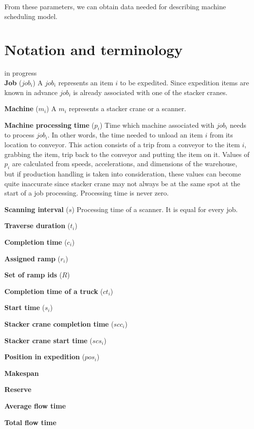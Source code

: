 \documentclass{ctuthesis}
\begin{document}
From these parameters, we can obtain data needed for describing machine scheduling model.


\section{Notation and terminology}
in progress\\
\noindent \textbf{Job} ($job_i$) A $job_i$ represents an item $i$ to be expedited. Since expedition items are known in advance $job_i$ is already associated with one of the stacker cranes. 

\noindent \textbf{Machine} ($m_i$) A $m_i$ represents a stacker crane or a scanner. 

\noindent \textbf{Machine processing time} ($p_i$) Time which machine associated with $job_i$ needs to process $job_i$. In other words, the time needed to unload an item $i$ from its location to conveyor. This action consists of a trip from a conveyor to the item $i$, grabbing the item, trip back to the conveyor and putting the item on it. Values of $p_i$ are calculated from speeds, accelerations, and dimensions of the warehouse, but if production handling is taken into consideration, these values can become quite inaccurate since stacker crane may not always be at the same spot at the start of a job processing. Processing time is never zero.


\noindent \textbf{Scanning interval} ($s$) Processing time of a scanner. It is equal for every job.

\noindent \textbf{Traverse duration} ($t_i$)

\noindent \textbf{Completion time} ($c_i$)

\noindent \textbf{Assigned ramp} ($r_i$)

\noindent \textbf{Set of ramp ids} ($R$)

\noindent \textbf{Completion time of a truck} ($ct_i$)

\noindent \textbf{Start time} ($s_i$)

\noindent \textbf{Stacker crane completion time} ($scc_i$)

\noindent \textbf{Stacker crane start time} ($scs_i$)

\noindent \textbf{Position in expedition} ($pos_i$)

\noindent \textbf{Makespan}

\noindent \textbf{Reserve}

\noindent \textbf{Average flow time}

\noindent \textbf{Total flow time}
\end{document}
